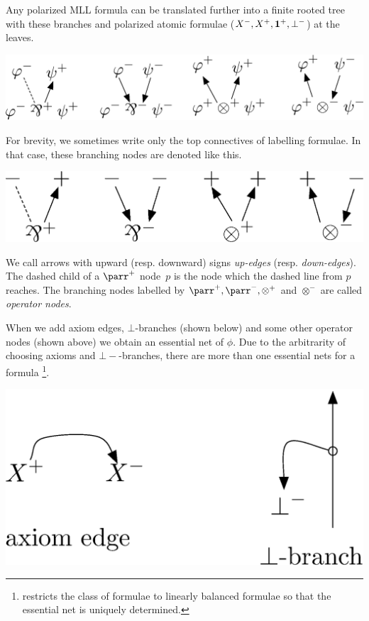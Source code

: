 Any polarized MLL formula can be translated further into
a finite rooted tree with these branches and polarized atomic formulae
($X^-, X^+, \mathbf{1}^+,\bot^-$) at the leaves. 
 \begin{center}
  \includegraphics[scale=0.4]{rules-original.eps}
 \end{center}
For brevity, we sometimes write only the top connectives of labelling
formulae.
In that case, these branching nodes are denoted like this.
 \begin{center} %
  \includegraphics[scale=0.4]{rules.eps}
 \end{center}
We call arrows with upward (resp. downward) signs
\textit{up-edges}
(resp. \textit{down-edges}).
The dashed child of a $\parr^+$ node~$p$ is the node which the dashed
line from $p$ reaches.
The branching nodes labelled by $\parr^+, \parr^-, \otimes^+$ and
$\otimes^-$ are called \textit{operator nodes}.

When we add axiom edges, $\bot$-branches (shown below)
and some other operator nodes (shown above)
we obtain an
essential net of $\phi$.
Due to the arbitrarity of choosing axioms and $\bot-$-branches,
there are more than one essential nets for a formula%
\footnote{\citet{murawski2003} restricts the class of formulae to linearly balanced
formulae so that the essential net is uniquely determined.}.
 \begin{center}
  \includegraphics[scale=0.4]{axiom-cut.eps}
 \end{center}

